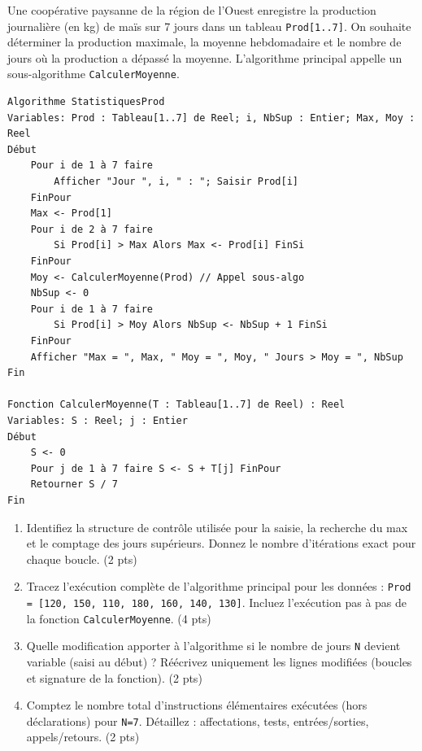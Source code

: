 \documentclass[11pt]{article}
\begin{document}
\begin{exercice}
Une coopérative paysanne de la région de l'Ouest enregistre la production journalière (en kg) de maïs sur 7 jours dans un tableau \texttt{Prod[1..7]}. On souhaite déterminer la production maximale, la moyenne hebdomadaire et le nombre de jours où la production a dépassé la moyenne. L'algorithme principal appelle un sous-algorithme \texttt{CalculerMoyenne}.
\begin{verbatim}
Algorithme StatistiquesProd
Variables: Prod : Tableau[1..7] de Reel; i, NbSup : Entier; Max, Moy : Reel
Début
    Pour i de 1 à 7 faire
        Afficher "Jour ", i, " : "; Saisir Prod[i]
    FinPour
    Max <- Prod[1]
    Pour i de 2 à 7 faire
        Si Prod[i] > Max Alors Max <- Prod[i] FinSi
    FinPour
    Moy <- CalculerMoyenne(Prod) // Appel sous-algo
    NbSup <- 0
    Pour i de 1 à 7 faire
        Si Prod[i] > Moy Alors NbSup <- NbSup + 1 FinSi
    FinPour
    Afficher "Max = ", Max, " Moy = ", Moy, " Jours > Moy = ", NbSup
Fin

Fonction CalculerMoyenne(T : Tableau[1..7] de Reel) : Reel
Variables: S : Reel; j : Entier
Début
    S <- 0
    Pour j de 1 à 7 faire S <- S + T[j] FinPour
    Retourner S / 7
Fin
\end{verbatim}
\begin{enumerate}
    \item Identifiez la structure de contrôle utilisée pour la saisie, la recherche du max et le comptage des jours supérieurs. Donnez le nombre d'itérations exact pour chaque boucle. (2 pts)
    \item Tracez l'exécution complète de l'algorithme principal pour les données : \texttt{Prod = [120, 150, 110, 180, 160, 140, 130]}. Incluez l'exécution pas à pas de la fonction \texttt{CalculerMoyenne}. (4 pts)
    \item Quelle modification apporter à l'algorithme si le nombre de jours \texttt{N} devient variable (saisi au début) ? Réécrivez uniquement les lignes modifiées (boucles et signature de la fonction). (2 pts)
    \item Comptez le nombre total d'instructions élémentaires exécutées (hors déclarations) pour \texttt{N=7}. Détaillez : affectations, tests, entrées/sorties, appels/retours. (2 pts)
\end{enumerate}
\end{exercice}
\end{document}
